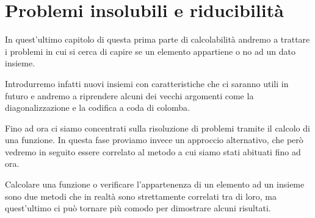 \chapter{Problemi insolubili e riducibilità}
In quest'ultimo capitolo di questa prima parte di calcolabilità
andremo a trattare i problemi in cui si cerca di capire se un
elemento appartiene o no ad un dato insieme.

Introdurremo infatti  nuovi insiemi con caratteristiche che ci
saranno utili in futuro e andremo a riprendere alcuni dei vecchi
argomenti come la diagonalizzazione e la codifica a coda di
colomba.

Fino ad ora ci siamo concentrati sulla risoluzione di problemi
tramite il calcolo di una funzione. In questa fase proviamo
invece un approccio alternativo, che però vedremo in seguito
essere correlato al metodo a cui siamo stati abituati fino ad
ora.

Calcolare una funzione o verificare l'appartenenza di un
elemento ad un insieme sono due metodi che in realtà sono
strettamente correlati tra di loro, ma quest'ultimo ci può
tornare più comodo per dimostrare alcuni risultati.
